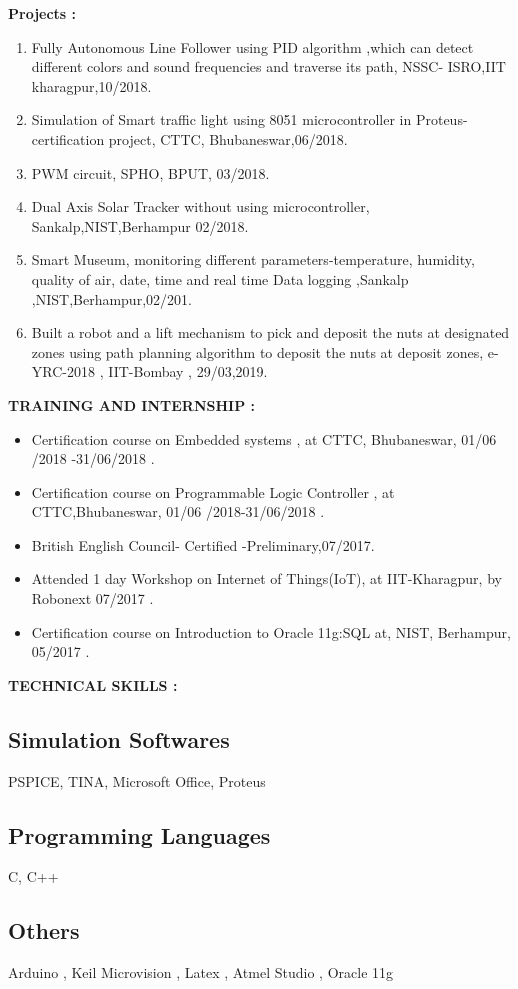 \documentclass[a4]{article}
\begin{document}
\vspace{3mm}
\textbf{Projects : } 
\begin{enumerate}
	\item Fully Autonomous Line Follower using PID algorithm ,which can detect different colors and sound frequencies 
and traverse its path, NSSC- ISRO,IIT kharagpur,10/2018. 
	\item Simulation of Smart traffic light using 8051 microcontroller in Proteus-certification project, CTTC, 
Bhubaneswar,06/2018.
         \item PWM circuit, SPHO, BPUT, 03/2018. 
         \item Dual Axis Solar Tracker without using microcontroller, Sankalp,NIST,Berhampur 02/2018.
         \item Smart Museum, monitoring different parameters-temperature, humidity, quality of air, date, time and real time 
Data logging ,Sankalp ,NIST,Berhampur,02/201.
         \item Built a robot and a lift mechanism to pick and deposit the nuts at designated zones using path planning algorithm to deposit
the nuts at deposit zones, e-YRC-2018 , IIT-Bombay , 29/03,2019.
\end{enumerate}

\vspace{3mm}
\textbf{TRAINING AND INTERNSHIP : } 
\begin{itemize}
	\item Certification course on Embedded systems , at CTTC, Bhubaneswar, 01/06
/2018 -31/06/2018 .
	\item Certification course on Programmable Logic Controller , at CTTC,Bhubaneswar, 01/06
/2018-31/06/2018 .
         \item British English Council- Certified -Preliminary,07/2017. 
         \item Attended 1 day Workshop on Internet of Things(IoT), at IIT-Kharagpur, by Robonext 07/2017 .
         \item Certification course on Introduction to Oracle 11g:SQL  at, NIST, Berhampur, 
05/2017 .
\end{itemize}

\vspace{3mm}
\textbf{TECHNICAL SKILLS : } 

\subsection{Simulation Softwares}	
      PSPICE, TINA, Microsoft Office, Proteus
\subsection{Programming Languages}
 C, C++
\subsection{Others}
Arduino , Keil Microvision , Latex , Atmel Studio , Oracle 11g
\end{document}
